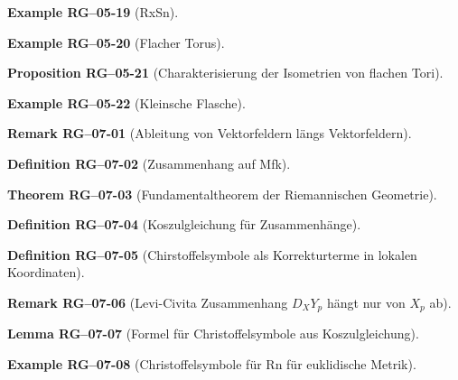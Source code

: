 \documentclass[10pt, letterpaper]{article}
\newcommand{\CustomHeading}[3]{%
  \par\medskip\noindent%
  \textbf{#1 #2} \textnormal{(#3)}.\enskip%
}
\newenvironment{DEF}[2]{\CustomHeading{Definition}{#1}{#2}}{}
\newenvironment{PROP}[2]{\CustomHeading{Proposition}{#1}{#2}}{}
\newenvironment{THEO}[2]{\CustomHeading{Theorem}{#1}{#2}}{}
\newenvironment{LEM}[2]{\CustomHeading{Lemma}{#1}{#2}}{}
\newenvironment{REM}[2]{\CustomHeading{Remark}{#1}{#2}}{}
\newenvironment{EXA}[2]{\CustomHeading{Example}{#1}{#2}}{}
\begin{document}
\begin{EXA}{RG--05-19}{RxSn}
\end{EXA}

\begin{EXA}{RG--05-20}{Flacher Torus}
\end{EXA}

\begin{PROP}{RG--05-21}{Charakterisierung der Isometrien von flachen Tori}
\end{PROP}

\begin{EXA}{RG--05-22}{Kleinsche Flasche}
\end{EXA}

\begin{REM}{RG--07-01}{Ableitung von Vektorfeldern längs Vektorfeldern}
\end{REM}

\begin{DEF}{RG--07-02}{Zusammenhang auf Mfk}
\end{DEF}

\begin{THEO}{RG--07-03}{Fundamentaltheorem der Riemannischen Geometrie}
\end{THEO}

\begin{DEF}{RG--07-04}{Koszulgleichung für Zusammenhänge}
\end{DEF}

\begin{DEF}{RG--07-05}{Chirstoffelsymbole als Korrekturterme in lokalen Koordinaten}
\end{DEF}

\begin{REM}{RG--07-06}{Levi-Civita Zusammenhang $D_XY_p$ hängt nur von $X_p$ ab}
\end{REM}

\begin{LEM}{RG--07-07}{Formel für Christoffelsymbole aus Koszulgleichung}
\end{LEM}

\begin{EXA}{RG--07-08}{Christoffelsymbole für Rn für euklidische Metrik}
\end{EXA}
\end{document}
